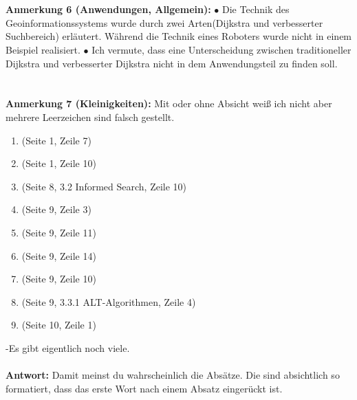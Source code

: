 \documentclass[a4paper,12pt]{book}
\begin{document}
\\
\\
\textbf{Anmerkung 6 (Anwendungen, Allgemein):}
\newline
$\bullet$ Die Technik des Geoinformationssystems wurde durch zwei Arten(Dijkstra und verbesserter Suchbereich) erläutert. Während die Technik eines Roboters wurde nicht in einem Beispiel realisiert.
\newline
$\bullet$ Ich vermute, dass eine Unterscheidung zwischen traditioneller Dijkstra und verbesserter Dijkstra nicht in dem Anwendungsteil zu finden soll. 
\newline 
 \\
 \\
\\
\textbf{Anmerkung 7 (Kleinigkeiten):}
Mit oder ohne Absicht weiß ich nicht aber mehrere Leerzeichen sind falsch gestellt.
\begin{enumerate}
	\item  (Seite 1, Zeile 7)
	\item  (Seite 1, Zeile 10)
	\item  (Seite 8, 3.2 Informed Search, Zeile 10)
	\item  (Seite 9, Zeile 3)
	\item  (Seite 9, Zeile 11)
	\item  (Seite 9, Zeile 14)
	\item  (Seite 9, Zeile 10)
	\item  (Seite 9, 3.3.1 ALT-Algorithmen, Zeile 4)
	\item  (Seite 10, Zeile 1)
\end{enumerate}
-Es gibt eigentlich noch viele.
\\ \\
\textbf{Antwort:}
Damit meinst du wahrscheinlich die Absätze. Die sind absichtlich so formatiert, dass das erste Wort nach einem Absatz eingerückt ist.
\\
\end{document}
